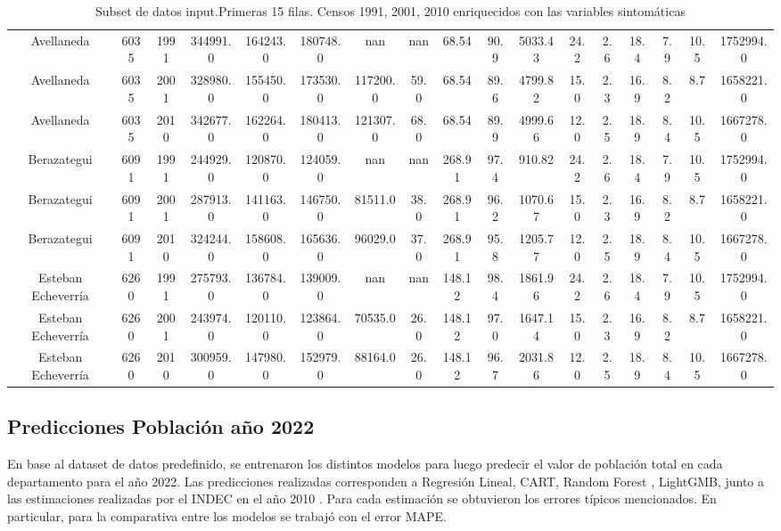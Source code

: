 \documentclass{article}
\theoremstyle{mytheoremstyle}
\theoremstyle{mytheoremstyle}
\theoremstyle{myproblemstyle}
\begin{document}
{\begin{landscape}
\begin{table}[htb]
\begin{tabular}{|c|c|c|c|c|c|c|c|c|c|c|c|c|c|c|c|c|}
        Avellaneda & 6035 & 1991 & 344991.0 & 164243.0 & 180748.0 & nan & nan & 68.54 & 90.9 & 5033.43 & 24.2 & 2.6 & 18.4 & 7.9 & 10.5 & 1752994.0 \\
        Avellaneda & 6035 & 2001 & 328980.0 & 155450.0 & 173530.0 & 117200.0 & 59.0 & 68.54 & 89.6 & 4799.82 & 15.0 & 2.3 & 16.9 & 8.2 & 8.7 & 1658221.0 \\
        Avellaneda & 6035 & 2010 & 342677.0 & 162264.0 & 180413.0 & 121307.0 & 68.0 & 68.54 & 89.9 & 4999.66 & 12.0 & 2.5 & 18.9 & 8.4 & 10.5 & 1667278.0 \\
        Berazategui & 6091 & 1991 & 244929.0 & 120870.0 & 124059.0 & nan & nan & 268.91 & 97.4 & 910.82 & 24.2 & 2.6 & 18.4 & 7.9 & 10.5 & 1752994.0 \\
        Berazategui & 6091 & 2001 & 287913.0 & 141163.0 & 146750.0 & 81511.0 & 38.0 & 268.91 & 96.2 & 1070.67 & 15.0 & 2.3 & 16.9 & 8.2 & 8.7 & 1658221.0 \\
        Berazategui & 6091 & 2010 & 324244.0 & 158608.0 & 165636.0 & 96029.0 & 37.0 & 268.91 & 95.8 & 1205.77 & 12.0 & 2.5 & 18.9 & 8.4 & 10.5 & 1667278.0 \\
        Esteban Echeverría & 6260 & 1991 & 275793.0 & 136784.0 & 139009.0 & nan & nan & 148.12 & 98.4 & 1861.96 & 24.2 & 2.6 & 18.4 & 7.9 & 10.5 & 1752994.0 \\
        Esteban Echeverría & 6260 & 2001 & 243974.0 & 120110.0 & 123864.0 & 70535.0 & 26.0 & 148.12 & 97.0 & 1647.14 & 15.0 & 2.3 & 16.9 & 8.2 & 8.7 & 1658221.0 \\
        Esteban Echeverría & 6260 & 2010 & 300959.0 & 147980.0 & 152979.0 & 88164.0 & 26.0 & 148.12 & 96.7 & 2031.86 & 12.0 & 2.5 & 18.9 & 8.4 & 10.5 & 1667278.0 \\
        \hline
      \end{tabular}
      \caption{Subset de datos input.Primeras 15 filas. Censos 1991, 2001, 2010 enriquecidos con las variables sintomáticas}
    \label{tab:baseModelos}
    \end{table}
    \end{landscape}
    }

 \subsection{Predicciones Población año 2022}

 En base al dataset de datos predefinido, se entrenaron los distintos modelos para luego predecir el valor de población total en cada
 departamento para el año 2022. Las predicciones realizadas corresponden a  Regresión Lineal, CART, Random Forest , LightGMB, junto a las 
estimaciones realizadas por el INDEC en el año 2010 . Para cada estimación se obtuvieron los errores 
 típicos mencionados. En particular, para la comparativa entre los modelos se trabajó con el error MAPE.\newline
\end{document}
